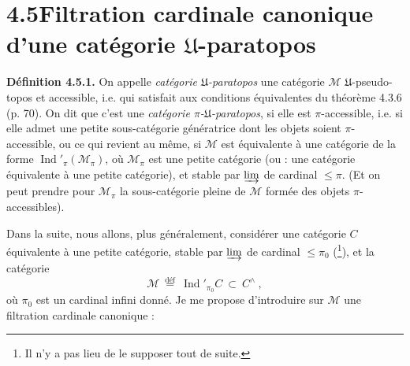 \documentclass[11pt]{article}
\newcommand{\printedpage}[1]{\if\relax\detokenize{#1}\relax\else\marginpar{\footnotesize p.~#1}\fi}
\newcommand{\msp}[1]{\marginpar{\footnotesize [#1]}}
\newcommand{\Ind}{\operatorname{Ind}}
\begin{document}
\setcounter{footnote}{29}

\printedpage{29}

\section*{4.5\quad Filtration cardinale canonique d'une catégorie $\mathfrak{U}$-paratopos}

\textbf{Définition 4.5.1.} On appelle \textit{catégorie $\mathfrak{U}$-paratopos} une catégorie $\mathcal{M}$ $\mathfrak{U}$-pseudo-topos et accessible, i.e. qui satisfait aux conditions équivalentes du théorème 4.3.6 (p. 70). On dit que c'est une \textit{catégorie $\pi$-$\mathfrak{U}$-paratopos}, si elle est $\pi$-accessible, i.e. si elle admet une petite sous-catégorie génératrice dont les objets soient $\pi$-accessible, ou ce qui revient au même, si %
$\mathcal{M}$ est équivalente à une catégorie de la forme $\Ind'_{\pi}(\mathcal{M}_{\pi})$, où $\mathcal{M}_{\pi}$ est une petite catégorie (ou : une catégorie équivalente à une petite catégorie), et stable par $\varinjlim$ de cardinal $\leqslant \pi$. (Et on peut prendre pour $\mathcal{M}_{\pi}$ la sous-catégorie pleine de $\mathcal{M}$ formée des objets
\msp{page 107}
$\pi$-accessibles).

Dans la suite, nous allons, plus généralement, considérer une catégorie $C$ équivalente à une petite catégorie, stable par $\varinjlim$ de cardinal $\leqslant \pi_0$ (\footnote{Il n'y a pas lieu de le supposer tout de suite.}), et la catégorie
\[
\mathcal{M} \ \overset{\text{déf}}{=}\ \Ind'_{\pi_0}C \ \subset\ C^{\wedge}\ ,
\tag*{(4.5.1)}
\]
où $\pi_0$ est un cardinal infini donné. Je me propose d'introduire sur $\mathcal{M}$ une filtration cardinale canonique :
\end{document}
